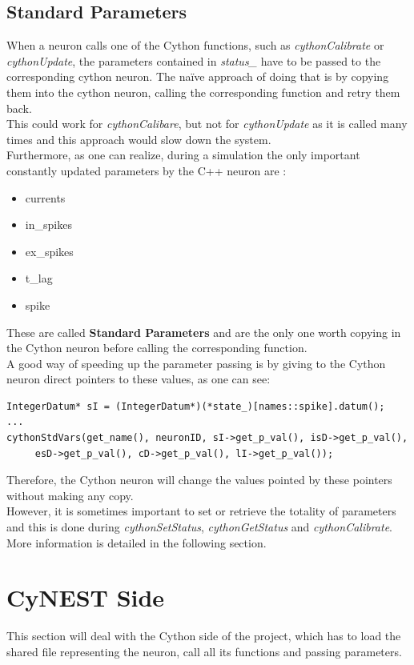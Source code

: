 \documentclass{article}
\begin{document}
\subsection{Standard Parameters}
When a neuron calls one of the Cython functions, such as \emph{cythonCalibrate} or \emph{cythonUpdate}, the parameters contained in \emph{status\_} have to be passed to the corresponding cython neuron. The naïve approach of doing that is by copying them into the cython neuron, calling the corresponding function and retry them back.\\
This could work for \emph{cythonCalibare}, but not for \emph{cythonUpdate} as it is called many times and this approach would slow down the system. \\
Furthermore, as one can realize, during a simulation the only important constantly updated parameters by the C++ neuron are :\\
\begin{itemize}
\item currents
\item in\_spikes
\item ex\_spikes
\item t\_lag
\item spike
\end{itemize}
These are called \textbf{Standard Parameters} and are the only one worth copying in the Cython neuron before calling the corresponding function.\\
A good way of speeding up the parameter passing is by giving to the Cython neuron direct pointers to these values, as one can see:
\begin{verbatim}
IntegerDatum* sI = (IntegerDatum*)(*state_)[names::spike].datum();
...
cythonStdVars(get_name(), neuronID, sI->get_p_val(), isD->get_p_val(), 
     esD->get_p_val(), cD->get_p_val(), lI->get_p_val());
\end{verbatim}
Therefore, the Cython neuron will change the values pointed by these pointers without making any copy.\\
However, it is sometimes important to set or retrieve the totality of parameters and this is done during \emph{cythonSetStatus}, \emph{cythonGetStatus} and \emph{cythonCalibrate}.
More information is detailed in the following section.
\section{CyNEST Side}
This section will deal with the Cython side of the project, which has to load the shared file representing the neuron, call all its functions and passing parameters.
\end{document}

